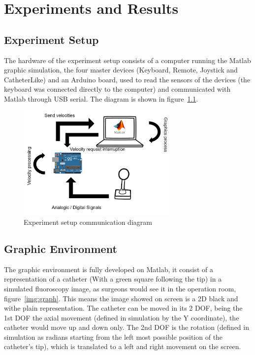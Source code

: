 
\chapter{Experiments and Results}\label{sec:experiments}

\section{Experiment Setup}\label{sec:setup}
The hardware of the experiment setup consists of a computer running the Matlab graphic simulation, the four master devices (Keyboard, Remote, Joystick and CatheterLike) and an Arduino board, used to read the sensors of the devices (the keyboard was connected directly to the computer) and communicated with Matlab through USB serial. The diagram is shown in figure~\ref{img:expsetup}.\\

\begin{figure}[ht]
   \centering
   \includegraphics[width=0.7\textwidth]{img/expsetup.PNG}
   \caption{Experiment setup communication diagram}
   \label{img:expsetup}
\end{figure}

\section{Graphic Environment}\label{sec:environment}
The graphic environment is fully developed on Matlab, it consist of a representation of a catheter (With a green square following the tip) in a simulated fluoroscopy image, as surgeons would see it in the operation room, figure~\ref{img:graph}. This means the image showed on screen is a 2D black and withe plain representation. The catheter can be moved in its 2 DOF, being the 1st DOF the axial movement (defined in simulation by the Y coordinate), the catheter would move up and down only. The 2nd DOF is the rotation (defined in simulation as radians starting from the left most possible position of the catheter's tip), which is translated to a left and right movement on the screen.\\

